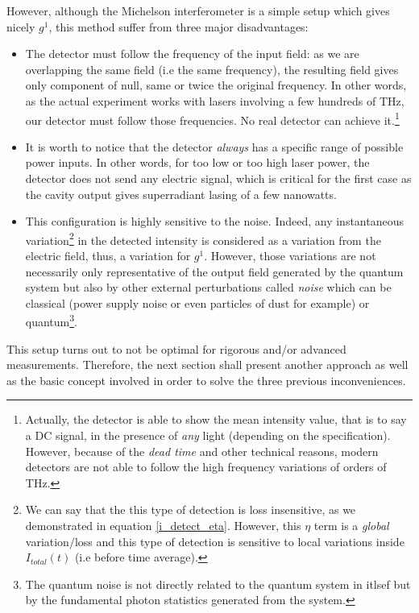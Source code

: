\documentclass[11pt]{report}
\begin{document}
However, although the Michelson interferometer is a simple setup which gives nicely $g^1$, this method suffer from three major disadvantages:
\begin{itemize}
	\item The detector must follow the frequency of the input field: as we are overlapping the same field (i.e the same frequency), the resulting field gives only component of null, same or twice the original frequency. In other words, as the actual experiment works with lasers involving a few hundreds of THz, our detector must follow those frequencies. No real detector can achieve it.\footnote{Actually, the detector is able to show the mean intensity value, that is to say a DC signal, in the presence of \textit{any} light (depending on the specification). However, because of the \textit{dead time} and other technical reasons, modern detectors are not able to follow the high frequency variations of orders of THz.}
	\item It is worth to notice that the detector \textit{always} has a specific range of possible power inputs. In other words, for too low or too high laser power, the detector does not send any electric signal, which is critical for the first case as the cavity output gives superradiant lasing of a few nanowatts.
	\item This configuration is highly sensitive to the noise. Indeed, any instantaneous variation\footnote{We can say that the this type of detection is loss insensitive, as we demonstrated in equation \ref{i_detect_eta}. However, this $\eta$ term is a \textit{global} variation/loss and this type of detection is sensitive to local variations inside $I_{total}(t)$ (i.e before time average).} in the detected intensity is considered as a variation from the electric field, thus, a variation for $g^1$. However, those variations are not necessarily only representative of the output field generated by the quantum system but also by other external perturbations called \textit{noise} which can be classical (power supply noise or even particles of dust for example) or quantum\footnote{The quantum noise is not directly related to the quantum system in itlsef but by the fundamental photon statistics generated from the system.}.
\end{itemize}

This setup turns out to not be optimal for rigorous and/or advanced measurements. Therefore, the next section shall present another approach as well as the basic concept involved in order to solve the three previous inconveniences.
\end{document}
